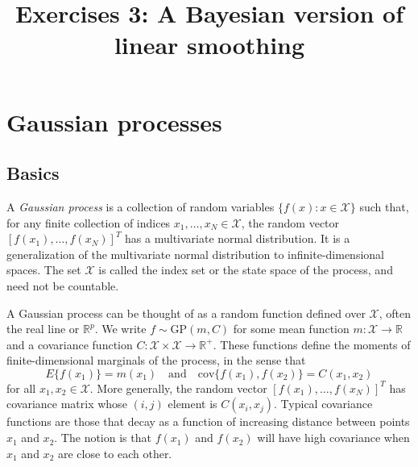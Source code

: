 \documentclass{mynotes}
\title[Exercises 3 $\cdot$ SSC 383D]{Exercises 3: A Bayesian version of linear smoothing}
\date{}  %
\begin{document}
\maketitle%

\section{Gaussian processes}

\subsection{Basics}

A \textit{Gaussian process} is a collection of random variables $\{f(x): x \in \mathcal{X}\}$ such that, for any finite collection of indices $x_1, \ldots, x_N \in \mathcal{X}$, the random vector $[f(x_1), \ldots, f(x_N)]^T$ has a multivariate normal distribution.  It is a generalization of the multivariate normal distribution to infinite-dimensional spaces. The set $\mathcal{X}$ is called the index set or the state space of the process, and need not be countable.

A Gaussian process can be thought of as a random function defined over $\mathcal{X}$, often the real line or $\mathbb{R}^p$.  We write $f \sim \mbox{GP}(m, C)$ for some mean function $m: \mathcal{X} \rightarrow \mathbb{R}$ and a covariance function $C: \mathcal{X} \times \mathcal{X} \rightarrow \mathbb{R}^+$.  These functions define the moments of finite-dimensional marginals of the process, in the sense that
$$
E\{ f(x_1) \} = m(x_1) \quad \mbox{and} \quad \mbox{cov}\{f(x_1), f(x_2) \} = C(x_1, x_2)
$$
for all $x_1, x_2 \in \mathcal{X}$.  More generally, the random vector $[f(x_1), \ldots, f(x_N)]^T$ has covariance matrix whose $(i,j)$ element is $C(x_i, x_j)$.  Typical covariance functions are those that decay as a function of increasing distance between points $x_1$ and $x_2$.  The notion is that $f(x_1)$ and $f(x_2)$ will have high covariance when $x_1$ and $x_2$ are close to each other.
\end{document}
